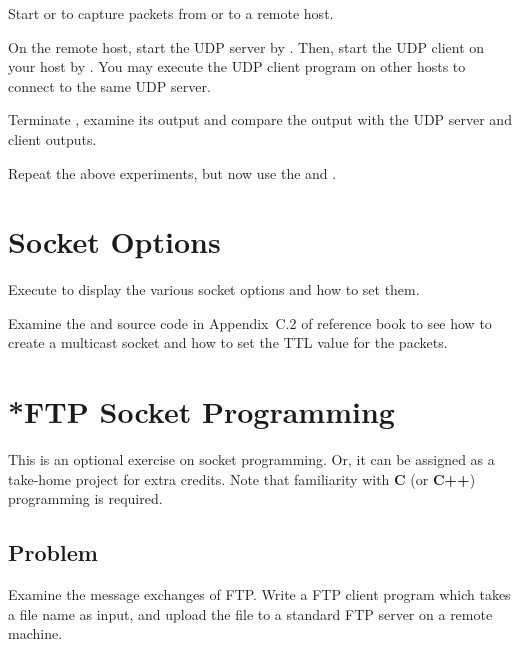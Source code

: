 \documentclass{../UTNetLab}
\begin{document}
Start  or  to capture packets from or to a remote host.

On the remote host, start the UDP server by .
Then, start the UDP client on your host by .
You may execute the UDP client program on other hosts to connect to the same UDP server.

Terminate , examine its output and compare the output with the UDP server and client outputs.

Repeat the above experiments, but now use the  and .

\section{Socket Options}
Execute  to display the various socket options and how to set them.

Examine the  and  source code in Appendix~C.2 of reference book to see how to create a multicast socket and how to set the TTL value for the packets.


\section{*FTP Socket Programming}
This is an optional exercise on socket programming.
Or, it can be assigned as a take-home project for extra credits.
Note that familiarity with \textbf{C} (or \textbf{C++}) programming is required.

\subsection*{Problem}
Examine the message exchanges of FTP.
Write a FTP client program which takes a file name as input, and upload the file to a standard FTP server on a remote machine.
\end{document}

